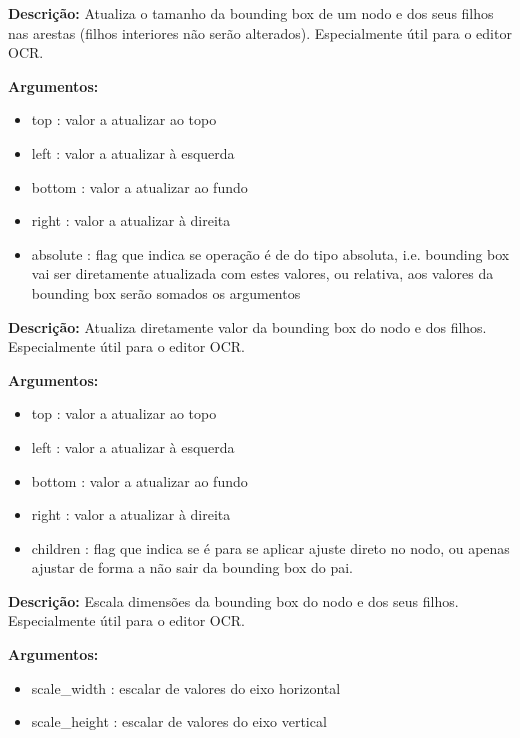 
\textbf{Descrição:} Atualiza o tamanho da bounding box de um nodo e dos seus filhos nas arestas (filhos interiores não serão alterados). Especialmente útil para o editor OCR.


\textbf{Argumentos:}
\begin{itemize}\setlength\itemsep{-0.3em}
	\vspace{-0.5em}
	\item top : valor a atualizar ao topo
	\item left : valor a atualizar à esquerda
	\item bottom : valor a atualizar ao fundo
	\item right : valor a atualizar à direita
	\item absolute : flag que indica se operação é de do tipo absoluta, i.e. bounding box vai ser diretamente atualizada com estes valores, ou relativa, aos valores da bounding box serão somados os argumentos
\end{itemize}


\textbf{Descrição:} Atualiza diretamente valor da bounding box do nodo e dos filhos. Especialmente útil para o editor OCR.

\textbf{Argumentos:}
\begin{itemize}\setlength\itemsep{-0.3em}
	\vspace{-0.5em}
	\item top : valor a atualizar ao topo
	\item left : valor a atualizar à esquerda
	\item bottom : valor a atualizar ao fundo
	\item right : valor a atualizar à direita
	\item children : flag que indica se é para se aplicar ajuste direto no nodo, ou apenas ajustar de forma a não sair da bounding box do pai.
\end{itemize}


\textbf{Descrição:} Escala dimensões da bounding box do nodo e dos seus filhos. Especialmente útil para o editor OCR.

\textbf{Argumentos:}
\begin{itemize}\setlength\itemsep{-0.3em}
	\vspace{-0.5em}
	\item scale\_width : escalar de valores do eixo horizontal
	\item scale\_height : escalar de valores do eixo vertical
\end{itemize}


